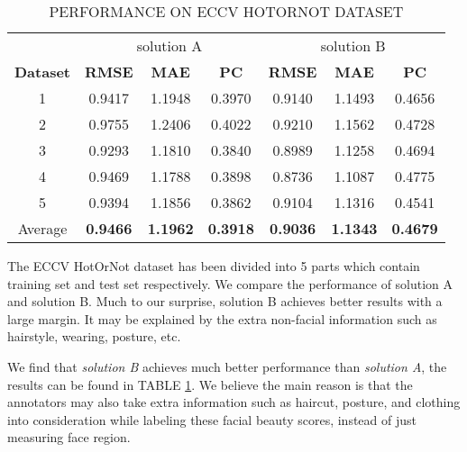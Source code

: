 \documentclass[a4paper,conference]{IEEEtran}
\begin{document}
    \begin{table}[!htb]
      \caption{PERFORMANCE ON ECCV HOTORNOT DATASET}
      \label{eccv performance}
      \begin{center}
        \begin{tabular}{c|ccc|ccc}
          \hline
          \multicolumn{1}{l|}{} &
          \multicolumn{3}{|c|}{solution A} &
          \multicolumn{3}{|c}{solution B} \\
          \cline{2-7}
          \textbf{Dataset} & \textbf{RMSE} & \textbf{MAE} & \textbf{PC} &
          \textbf{RMSE} & \textbf{MAE} & \textbf{PC} \\ \hline\hline
          1 & 0.9417 & 1.1948 & 0.3970 & 0.9140 & 1.1493 & 0.4656 \\
          2 & 0.9755 & 1.2406 & 0.4022 & 0.9210 & 1.1562 & 0.4728 \\
          3 & 0.9293 & 1.1810 & 0.3840 & 0.8989 & 1.1258 & 0.4694 \\
          4 & 0.9469 & 1.1788 & 0.3898 & 0.8736 & 1.1087 & 0.4775 \\
          5 & 0.9394 & 1.1856 & 0.3862 & 0.9104 & 1.1316 & 0.4541 \\
          Average & \textbf{0.9466} & \textbf{1.1962} & \textbf{0.3918}
          &\textbf{0.9036} & \textbf{1.1343} & \textbf{0.4679} \\ \hline
        \end{tabular}
        \begin{tablenotes}
          \footnotesize
          The ECCV HotOrNot dataset \cite{gray2010predicting} has been divided
          into 5 parts which contain training set and test set respectively.
          We compare the performance of solution A and solution B.
          Much to our surprise, solution B achieves better results with a large
          margin. It may be explained by the extra non-facial information such
          as hairstyle, wearing, posture, etc.
        \end{tablenotes}
      \end{center}
    \end{table}

    We find that \emph{solution B} achieves much better performance
    than \emph{solution A}, the results can be found in TABLE \ref{eccv performance}.
    We believe the main reason is that the annotators may also take extra information
    such as haircut, posture, and clothing into consideration while labeling these
    facial beauty scores, instead of just measuring face region.
\end{document}
